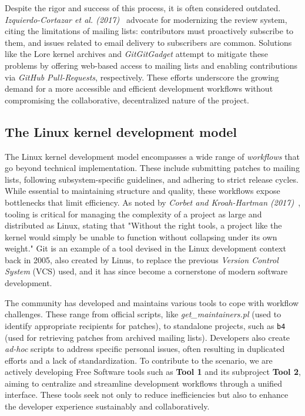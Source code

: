 \documentclass[sigconf]{acmart} %
\begin{document}
Despite the rigor and success of this process, it is often considered outdated.
\textit{Izquierdo-Cortazar et al. (2017)}~\cite{izquierdo2017-review} advocate
for modernizing the review system, citing the limitations of mailing lists:
contributors must proactively subscribe to them, and issues related to email
delivery to subscribers are common. Solutions like the Lore kernel archives and
\textit{GitGitGadget} attempt to mitigate these problems by offering web-based
access to mailing lists and enabling contributions via \textit{GitHub
Pull-Requests}, respectively. These efforts underscore the growing demand for a
more accessible and efficient development workflows without compromising the
collaborative, decentralized nature of the project.

\subsection{The Linux kernel development model}

The Linux kernel development model encompasses a wide range of
\textit{workflows} that go beyond technical implementation. These include
submitting patches to mailing lists, following subsystem-specific guidelines,
and adhering to strict release cycles. While essential to maintaining structure
and quality, these workflows expose bottlenecks that limit efficiency. As noted
by \textit{Corbet and Kroah-Hartman
(2017)}~\cite{corbet-gregkh2017-linuxreport}, tooling is critical for managing
the complexity of a project as large and distributed as Linux, stating that
"Without the right tools, a project like the kernel would simply be unable to
function without collapsing under its own weight." Git is an example of a tool
devised in the Linux development context back in 2005, also created by Linus, to
replace the previous \textit{Version Control System} (VCS) used, and it has
since become a cornerstone of modern software development.

The community has developed and maintains various tools to cope with workflow
challenges. These range from official scripts, like \textit{get\_maintainers.pl}
(used to identify appropriate recipients for patches), to standalone projects,
such as \texttt{b4} (used for retrieving patches from archived mailing lists).
Developers also create \textit{ad-hoc} scripts to address specific personal
issues, often resulting in duplicated efforts and a lack of standardization. To
contribute to the scenario, we are actively developing Free Software tools such
as \textbf{Tool 1} and its subproject \textbf{Tool 2}, aiming to centralize and
streamline development workflows through a unified interface. These tools seek
not only to reduce inefficiencies but also to enhance the developer experience
sustainably and collaboratively.
\end{document}
